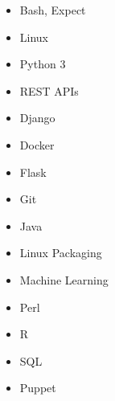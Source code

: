 \documentclass[10pt,a4paper,sans]{moderncv}        %
\begin{document}
\begin{multicols}{4}
\begin{itemize}

\item Bash, Expect
\item Linux
\item Python 3
\item REST APIs
\item Django
\item Docker
\item Flask
\item Git
\item Java
\item Linux Packaging
\item Machine Learning
\item Perl
\item R
\item SQL
\item Puppet

\end{itemize}
\end{multicols}


\nocite{*}


\end{document}
